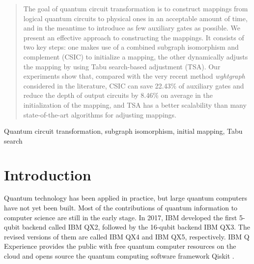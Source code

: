 \documentclass[journal]{IEEEtran}
\begin{document}
\begin{abstract}
The goal of quantum circuit transformation is to construct mappings from logical quantum circuits to physical ones in an acceptable amount of time, and in the meantime to introduce  as few auxiliary gates as possible. We present an effective approach to constructing the mappings. It consists of two key steps: one makes use of a combined subgraph isomorphism and complement (CSIC) to initialize a mapping, the other dynamically adjusts the mapping by using Tabu search-based adjustment (TSA). Our experiments show that, compared with the very recent method \emph{wghtgraph} considered in the literature, CSIC can save 22.43\% of auxiliary gates and reduce the depth of output circuits by 8.46\% on average in the initialization of the mapping, and  TSA has a better scalability than many state-of-the-art algorithms for adjusting mappings.
\end{abstract}

\begin{IEEEkeywords}
Quantum circuit transformation,  subgraph isomorphism, initial mapping, Tabu search
\end{IEEEkeywords}

%
\IEEEpeerreviewmaketitle
\section{Introduction}
Quantum technology has been applied in practice, but large quantum computers have not yet been built. Most of the contributions of quantum information to computer science are still in the early stage. In 2017, IBM developed the first 5-qubit backend called IBM QX2, followed by the 16-qubit backend  IBM QX3. The revised versions of them are called IBM QX4 and IBM QX5, respectively. IBM Q Experience \cite{ibm} provides the public with free quantum computer resources on the cloud and opens source the quantum computing software framework Qiskit \cite{qiskit}. 
\end{document}
